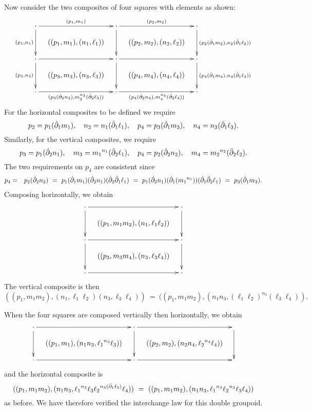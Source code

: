 \bigskip
Now consider the two composites of four squares with elements as shown: 
$$
\xymatrix  @C=0.8pc @R=0.8pc{
\cdot \ar[rr]^{(p_1,m_1)} \ar[dd]_{(p_1,n_1)} 
  &   & \cdot \ar[rr]^{(p_2,m_2)} \ar[dd] 
          &   & \cdot \ar[dd]^{(p_2(\dbdyo m_2),n_2(\ddbdyo\ell_2))}  \\
  & ((p_1,m_1),(n_1,\ell_1)) 
      &   & ((p_2,m_2),(n_2,\ell_2)) 
              &  \\
\cdot \ar[rr] \ar[dd]_{(p_3,n_3)}  
  &   & \cdot \ar[rr] \ar[dd]
          &   & \cdot \ar[dd]^{(p_4(\dbdyo m_4),n_4(\ddbdyo\ell_4))}  \\
  & ((p_3,m_3),(n_3,\ell_3))  
      &   & ((p_4,m_4),(n_4,\ell_4)) 
              &  \\
\cdot \ar[rr]_{(p_3(\dbdyt n_3),m_3^{n_3}(\ddbdyt\ell_3))}  
  &   & \cdot \ar[rr]_{(p_4(\dbdyt n_4),m_4^{n_4}(\ddbdyt\ell_4))}  
          &   & \cdot  \\
}
$$
For the horizontal composites to be defined we require 
$$
p_2 = p_1(\dot{\partial}_1 m_1), \quad
n_2 = n_1(\ddot{\partial}_1\ell_1), \quad
p_4 = p_3(\dot{\partial}_1 m_3), \quad
n_4 = n_3(\ddot{\partial}_1\ell_3).
$$
Similarly, for the vertical composites, we require
$$
p_3 = p_1(\dot{\partial}_2 n_1), \quad
m_3 = {m_1}^{n_1}(\ddot{\partial}_2\ell_1), \quad
p_4 = p_2(\dot{\partial}_2 n_2), \quad
m_4 = {m_2}^{n_2}(\ddot{\partial}_2\ell_2).
$$
The two requirements on $p_4$ are consistent since
\begin{eqnarray*}
p_4 &=&  p_2(\dot{\partial}_2 n_2)
    ~=~  p_1(\dot{\partial}_1 m_1)(\dot{\partial}_2 n_1)(\dot{\partial}_2\ddot{\partial}_1\ell_1) 
    ~=~  p_1(\dot{\partial}_2 n_1)(\dot{\partial}_1({m_1}^{n_1}))(\dot{\partial}_1\ddot{\partial}_2\ell_1) 
    ~=~  p_3(\dot{\partial}_1 m_3). \\
\end{eqnarray*}
Composing horizontally, we obtain 
$$
\xymatrix  @C=0.8pc @R=0.8pc{
\cdot \ar[rr] \ar[dd] 
  &   & \cdot \ar[dd]  \\
  & ((p_1,m_1m_2),(n_1,\ell_1\ell_2)) 
      &  \\
\cdot \ar[rr] \ar[dd] 
  &   & \cdot \ar[dd]  \\
  & ((p_3,m_3m_4),(n_3,\ell_3\ell_4))  
      &  \\
\cdot \ar[rr] 
  &   & \cdot  \\
}
$$
The vertical composite is then
$$
((p_1,m_1m_2),(n_1,\ell_1\ell_2)(n_3,\ell_3\ell_4))
~=~ ((p_1,m_1m_2),(n_1n_3,(\ell_1\ell_2)^{n_3}(\ell_3\ell_4)). 
$$

\noindent
When the four squares are composed vertically then horizontally, 
we obtain
$$
\xymatrix  @C=0.8pc @R=0.8pc{
\cdot \ar[rr] \ar[dd] 
  &   & \cdot \ar[rr] \ar[dd]  
         &   & \ar[dd]  \\
  & ((p_1,m_1),(n_1n_3,{\ell_1}^{n_3}\ell_3)) 
      &  &  ((p_2,m_2),(n_2n_4,{\ell_2}^{n_4}\ell_4)) 
             &  \\
\cdot \ar[rr] 
  &   & \cdot \ar[rr]  
         &   &  \\
}
$$
and the horizontal composite is~  
$$
((p_1,m_1m_2), 
  (n_1n_3,{\ell_1}^{n_3}\ell_3{\ell_2}^{n_3(\ddot{\partial}_1\ell_3)}\ell_4))
~=~ 
((p_1,m_1m_2), 
  (n_1n_3,{\ell_1}^{n_3}{\ell_2}^{n_3}\ell_3\ell_4))
$$
as before. 
We have therefore verified the interchange law for this double groupoid.



